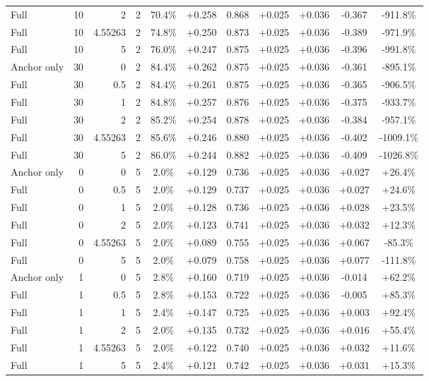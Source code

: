 \begin{table}[htbp]
\begin{tabular}{lrrrccccccc}
Full & 10 & 2 & 2 & 70.4\% & +0.258 & 0.868 & +0.025 & +0.036 & -0.367 & -911.8\% \\
Full & 10 & 4.55263 & 2 & 74.8\% & +0.250 & 0.873 & +0.025 & +0.036 & -0.389 & -971.9\% \\
Full & 10 & 5 & 2 & 76.0\% & +0.247 & 0.875 & +0.025 & +0.036 & -0.396 & -991.8\% \\
Anchor only & 30 & 0 & 2 & 84.4\% & +0.262 & 0.875 & +0.025 & +0.036 & -0.361 & -895.1\% \\
Full & 30 & 0.5 & 2 & 84.4\% & +0.261 & 0.875 & +0.025 & +0.036 & -0.365 & -906.5\% \\
Full & 30 & 1 & 2 & 84.8\% & +0.257 & 0.876 & +0.025 & +0.036 & -0.375 & -933.7\% \\
Full & 30 & 2 & 2 & 85.2\% & +0.254 & 0.878 & +0.025 & +0.036 & -0.384 & -957.1\% \\
Full & 30 & 4.55263 & 2 & 85.6\% & +0.246 & 0.880 & +0.025 & +0.036 & -0.402 & -1009.1\% \\
Full & 30 & 5 & 2 & 86.0\% & +0.244 & 0.882 & +0.025 & +0.036 & -0.409 & -1026.8\% \\
Anchor only & 0 & 0 & 5 & 2.0\% & +0.129 & 0.736 & +0.025 & +0.036 & +0.027 & +26.4\% \\
Full & 0 & 0.5 & 5 & 2.0\% & +0.129 & 0.737 & +0.025 & +0.036 & +0.027 & +24.6\% \\
Full & 0 & 1 & 5 & 2.0\% & +0.128 & 0.736 & +0.025 & +0.036 & +0.028 & +23.5\% \\
Full & 0 & 2 & 5 & 2.0\% & +0.123 & 0.741 & +0.025 & +0.036 & +0.032 & +12.3\% \\
Full & 0 & 4.55263 & 5 & 2.0\% & +0.089 & 0.755 & +0.025 & +0.036 & +0.067 & -85.3\% \\
Full & 0 & 5 & 5 & 2.0\% & +0.079 & 0.758 & +0.025 & +0.036 & +0.077 & -111.8\% \\
Anchor only & 1 & 0 & 5 & 2.8\% & +0.160 & 0.719 & +0.025 & +0.036 & -0.014 & +62.2\% \\
Full & 1 & 0.5 & 5 & 2.8\% & +0.153 & 0.722 & +0.025 & +0.036 & -0.005 & +85.3\% \\
Full & 1 & 1 & 5 & 2.4\% & +0.147 & 0.725 & +0.025 & +0.036 & +0.003 & +92.4\% \\
Full & 1 & 2 & 5 & 2.0\% & +0.135 & 0.732 & +0.025 & +0.036 & +0.016 & +55.4\% \\
Full & 1 & 4.55263 & 5 & 2.0\% & +0.122 & 0.740 & +0.025 & +0.036 & +0.032 & +11.6\% \\
Full & 1 & 5 & 5 & 2.4\% & +0.121 & 0.742 & +0.025 & +0.036 & +0.031 & +15.3\% \\

\end{tabular}
\end{table}
